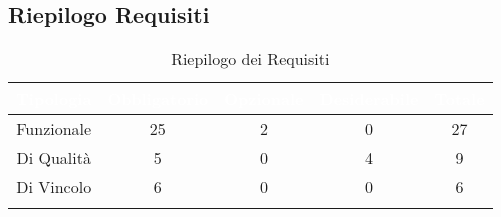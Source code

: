 \subsection{Riepilogo Requisiti}\label{Riepilogo}
\begin{center}
\begin{longtable}[c]{|c|c|c|c|c|}
\hline
\rowcolor{bluelogo}\textbf{\textcolor{white}{Tipologia}} & \textbf{\textcolor{white}{Obbligatorio}} & \textbf{\textcolor{white}{Opzionale}} & \textbf{\textcolor{white}{Desiderabile}} & \textbf{\textcolor{white}{Totale}}\\
\hline \hline
\endhead
Funzionale & 25 & 2 & 0 & 27\\
\hline
\rowcolor{grigio}Di Qualità & 5 & 0 & 4 & 9\\
\hline
Di Vincolo & 6 & 0 & 0 & 6\\
\hline
\caption{Riepilogo dei Requisiti}
\end{longtable}
\end{center}